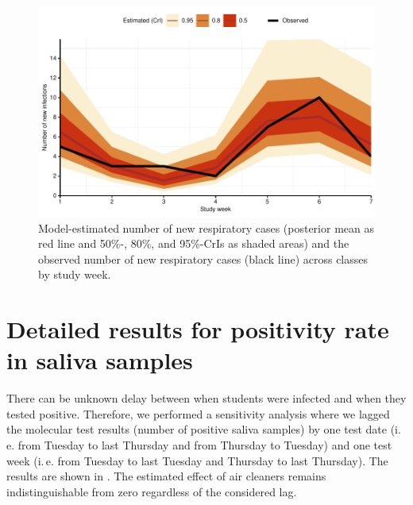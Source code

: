 \documentclass[fleqn,11pt]{wlscirep_supp}
\newcommand\ie{i.\,e.\xspace}
\begin{document}
\begin{figure}[!htpb]
    \centering
    \includegraphics{../../results/epi-data/model-fit.pdf}
    \caption[Comparison of model-estimates with observed case data]{Model-estimated number of new respiratory cases (posterior mean as red line and 50\%-, 80\%, and 95\%-CrIs as shaded areas) and the observed number of new respiratory cases (black line) across classes by study week.}
    \label{fig:coverage}
\end{figure}

\clearpage

\section{Detailed results for positivity rate in saliva samples}
\label{sec:detailed-molecular}

There can be unknown delay between when students were infected and when they tested positive. Therefore, we performed a sensitivity analysis where we lagged the molecular test results (number of positive saliva samples) by one test date (\ie from Tuesday to last Thursday and from Thursday to Tuesday) and one test week (\ie from Tuesday to last Tuesday and Thursday to last Thursday). The results are shown in . The estimated effect of air cleaners remains indistinguishable from zero regardless of the considered lag.  
\end{document}
